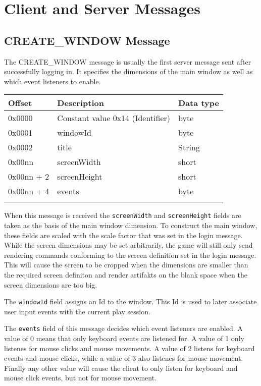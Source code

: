 \documentclass{article}
\newcommand{\field}[1]{\textcolor{fieldColor}{\texttt{#1}}}
\newenvironment{bytelisting}
{\ttfamily \begin{center} \begin{tabular}{l l l} Offset & Description & Data type \\ \hline}
{\normalfont \end{tabular} \end{center}}
\begin{document}

\section{Client and Server Messages}

\subsection{CREATE\_WINDOW Message}
The CREATE\_WINDOW message is usually the first server message sent after successfully logging in. It specifies the dimensions of the main window as well as which event listeners to enable.

\begin{bytelisting}
0x0000 & Constant value 0x14 (Identifier) & byte \\
0x0001 & windowId & byte \\
0x0002 & title & String \\
0x00nn & screenWidth & short \\
0x00nn + 2 & screenHeight & short \\
0x00nn + 4 & events & byte \\
\end{bytelisting}

When this message is received the \field{screenWidth} and \field{screenHeight} fields are taken as the basis of the main window dimension. To construct the main window, these fields are scaled with the
scale factor that was set in the login message. While the screen dimensions may be set arbitrarily, the game will still only send rendering commands conforming to the screen definition set in the
login message. This will cause the screen to be cropped when the dimensions are smaller than the required screen definiton and render artifakts on the blank space when the screen dimensions are too big.

The \field{windowId} field assigns an Id to the window. This Id is used to later associate user input events with the current play session.

The \field{events} field of this message decides which event listeners are enabled. A value of 0 means that only keyboard events are listened for. A value of 1 only listenes for mouse clicks and mouse movements.
A value of 2 listens for keyboard events and mouse clicks, while a value of 3 also listenes for mouse movement. Finally any other value will cause the client to only listen for keyboard and mouse click
events, but not for mouse movement.
\end{document}

